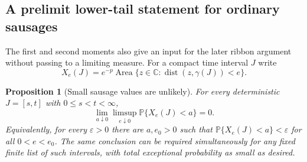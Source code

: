 \documentclass[11pt]{article}
\newtheorem{proposition}[theorem]{Proposition}
\theoremstyle{definition}
\theoremstyle{remark}
\numberwithin{equation}{section}
\begin{document}
\subsection{A prelimit lower-tail statement for ordinary sausages}

The first and second moments also give an input for the later ribbon
argument without passing to a limiting measure.  For a compact time
interval $J$ write
\[
 X_e(J)=e^{-p}\operatorname{Area}
  \{z\in\mathbb C:\operatorname{dist}(z,\gamma(J))<e\}.
\]

\begin{proposition}[Small sausage values are unlikely]
\label{retain:sausage}
For every deterministic $J=[s,t]$ with $0\le s<t<\infty$,
\begin{equation}
 \lim_{a\downarrow0}\limsup_{e\downarrow0}
 \mathbb P\{X_e(J)<a\}=0.
 \label{retain:sausage-tail}
\end{equation}
Equivalently, for every $\varepsilon>0$ there are $a,e_0>0$ such
that $\mathbb P\{X_e(J)<a\}<\varepsilon$ for all $0<e<e_0$.
The same conclusion can be required simultaneously for any fixed
finite list of such intervals, with total exceptional probability
as small as desired.
\end{proposition}
\end{document}
